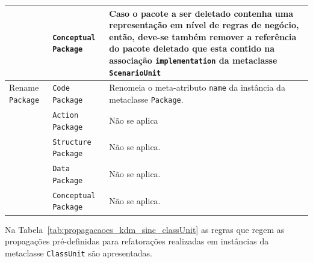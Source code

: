 \begin{longtable}{ | m{1.9cm} | m{3.57cm}| m{9.3cm} | }
\cline{2-3}
& \texttt{Conceptual Package} & Caso o pacote a ser deletado contenha uma representação em nível de regras de negócio, então, deve-se também remover a referência do pacote deletado que esta contido na associação \texttt{implementation} da metaclasse \texttt{ScenarioUnit} \tabularnewline
\hline
Rename \texttt{Package} & \texttt{Code Package} & Renomeia o meta-atributo \texttt{name} da instância da metaclasse \texttt{Package}.\tabularnewline
\cline{2-3}
& \texttt{Action Package} & Não se aplica \tabularnewline
\cline{2-3}
& \texttt{Structure Package} & Não se aplica. \tabularnewline
\cline{2-3}
& \texttt{Data Package} & Não se aplica. \tabularnewline
\cline{2-3}
& \texttt{Conceptual Package} & Não se aplica. \tabularnewline
 \end{longtable}

Na Tabela~\ref{tab:propagacaoes_kdm_sinc_classUnit} as regras que regem as propagações pré-definidas para refatorações realizadas em instâncias da metaclasse \texttt{ClassUnit} são apresentadas.

